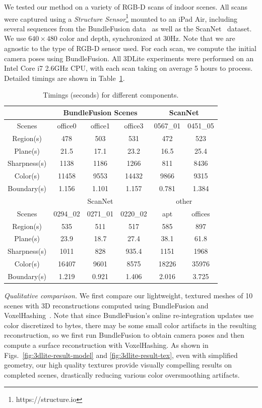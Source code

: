 We tested our method on a variety of RGB-D scans of indoor scenes.
All scans were captured using a \emph{Structure Sensor}\footnote{https://structure.io} mounted to an iPad Air, including several sequences from the BundleFusion data~\cite{dai2016bundlefusion} as well as the ScanNet~\cite{dai2017scannet} dataset.
We use $640\times 480$ color and depth, synchronized at $30$Hz.
Note that we are agnostic to the type of RGB-D sensor used.
For each scan, we compute the initial camera poses using BundleFusion. 
All 3DLite experiments  were performed on an Intel Core i7 2.6GHz CPU, with each scan taking on average 5 hours to process.
Detailed timings are shown in Table~\ref{table:3dlite-timing}.
\begin{table}
\center
\begin{tabular}{|c|c|c|c|c|c|}
\hline
& \multicolumn{3}{|c|}{BundleFusion Scenes} & \multicolumn{2}{|c|}{ScanNet}\\
\hline
Scenes & office0 & office1 & office3 & 0567\_01 & 0451\_05\\
\hline
Region(s) & 478 & 503 & 531 & 472 & 523\\
\hline
Plane(s) & 21.5 & 17.1 & 23.2 & 16.5 & 25.4\\
\hline
Sharpness(s) & 1138 & 1186 & 1266 & 811 & 8436\\
\hline
Color(s) & 11458 & 9553 & 14432 & 9866 & 9315\\
\hline
Boundary(s) & 1.156 & 1.101 & 1.157 & 0.781 & 1.384\\
\hline
\hline
& \multicolumn{3}{|c|}{ScanNet} & \multicolumn{2}{|c|}{other}\\
\hline
Scenes & 0294\_02 & 0271\_01 & 0220\_02 & apt & offices \\
\hline
Region(s) & 535 & 511 & 517 & 585 & 897\\
\hline
Plane(s) & 23.9 & 18.7 & 27.4 & 38.1 & 61.8\\
\hline
Sharpness(s) & 1011 & 828 & 935.4 & 1151 & 1968\\
\hline
Color(s) & 16407 & 9601 & 8575 & 18226 & 35976\\
\hline
Boundary(s) & 1.219 & 0.921 & 1.406 & 2.016 & 3.725\\
\hline
\end{tabular}
\caption{Timings (seconds) for different components.
}
\label{table:3dlite-timing}
\end{table}

\emph{Qualitative comparison.}
We first compare our lightweight, textured meshes of 10 scenes with 3D reconstructions computed using BundleFusion and VoxelHashing~\cite{niessner2013real}.
Note that since BundleFusion's online re-integration updates use color discretized to bytes, there may be some small color artifacts in the resulting reconstruction, so we first run BundleFusion to obtain camera poses and then compute a surface reconstruction with VoxelHashing.
As shown in Figs.~\ref{fig:3dlite-result-model} and \ref{fig:3dlite-result-tex}, even with simplified geometry, our high quality textures provide visually compelling results on completed scenes, drastically reducing various color oversmoothing artifacts.

